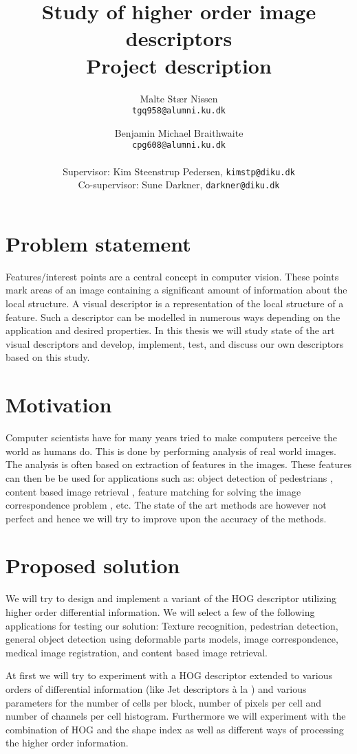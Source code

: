 \documentclass[11pt,a4paper]{article}
\title{\bfseries{Study of higher order image descriptors}\\Project description}
\author{
    Malte Stær Nissen \\\texttt{tgq958@alumni.ku.dk}
    \and
    Benjamin Michael Braithwaite \\ \texttt{cpg608@alumni.ku.dk}
    \\
    \\ \small{Supervisor: Kim Steenstrup Pedersen, \texttt{kimstp@diku.dk}}
    \\ \small{Co-supervisor: Sune Darkner, \texttt{darkner@diku.dk}}
    }
\begin{document}
\maketitle

\section{Problem statement}
Features/interest points are a central concept in computer vision. These
points mark areas of an image containing a significant amount of information
about the local structure. A visual descriptor is a representation of the
local structure of a feature. Such a descriptor can be modelled in numerous
ways depending on the application and desired properties. In this thesis we
will study state of the art visual descriptors and develop, implement, test,
and discuss our own descriptors based on this study.

\section{Motivation}
Computer scientists have for many years tried to make computers perceive the
world as humans do. This is done by performing analysis of real world images.
The analysis is often based on extraction of features in the images. These
features can then be be used for applications such as: object detection of
pedestrians \cite{felzenszwalb2008discriminatively},
content based image retrieval \cite{smeulders2000content},
feature matching for solving the image correspondence problem
\cite{dahl2011finding}, etc.
The state of the art methods are however
not perfect and hence we will try to improve upon the accuracy of the methods.

\section{Proposed solution}
We will try to design and implement a variant of the HOG descriptor utilizing
higher order differential information. We
will select a few of the following applications for testing our solution:
Texture recognition, pedestrian detection, general object detection using
deformable parts models, image correspondence, medical image registration, and
content based image retrieval.

At first we will try to experiment with a HOG descriptor extended to
various orders of differential information (like Jet descriptors à la
\cite{larsen2012jet}) and various parameters for the number of cells per
block, number of pixels per cell and number of channels per cell histogram.
Furthermore we will experiment with the combination of HOG and the shape index
\cite{koenderink1992surface} as well as different ways of processing the
higher order information.
\end{document}
